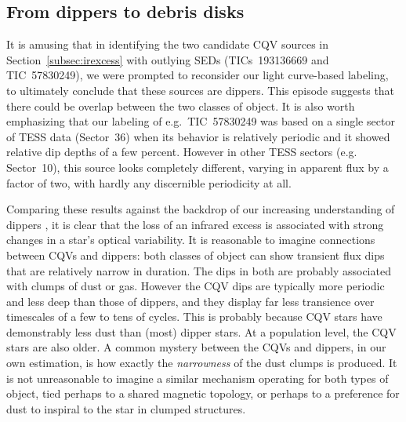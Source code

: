\documentclass[11pt,twocolumn,tighten]{aastex63}
\begin{document}


\subsection{From dippers to debris disks}
\label{subsec:discdippers}

It is amusing that in identifying the two candidate CQV sources in
Section~\ref{subsec:irexcess} with outlying SEDs (TICs~193136669 and
TIC~57830249), we were prompted to reconsider our light curve-based
labeling, to
ultimately conclude that these sources are dippers.  This episode
suggests that there could be overlap between the two classes of
object.  It is also worth emphasizing that our labeling of
e.g.~TIC~57830249 was based on a single sector of TESS data
(Sector~36) when its behavior is relatively periodic and it showed
relative dip depths of a few percent.  However in other TESS sectors
(e.g. Sector~10), this source looks completely different, varying in
apparent flux by a factor of two, with hardly any discernible
periodicity at all.

Comparing these results against the backdrop of our increasing
understanding of dippers
\citep[e.g.][]{2014AJ....147...82C,2016ApJ...816...69A,2021ApJ...908...16R,2022ApJS..263...14C},
it is clear that the loss of an infrared excess is associated with
strong changes in a star's optical variability.  It is reasonable to
imagine connections between CQVs and dippers: both classes of object
can show transient flux dips that are relatively narrow in duration.
The dips in both are probably associated with clumps of dust or gas.
However the CQV dips are typically more periodic and 
less deep than those of dippers, and they display far
less transience over timescales of a few to tens of cycles.  This is
probably because CQV stars have demonstrably less dust than (most)
dipper stars.  At a population level, the CQV stars are also older.  A
common mystery between the CQVs and dippers, in our own estimation, is
how exactly the {\it narrowness} of the dust clumps is produced.  It
is not unreasonable to imagine a similar mechanism operating for both
types of object, tied perhaps to a shared magnetic topology, or
perhaps to a preference for dust to inspiral to the star in clumped
structures.
\end{document}
